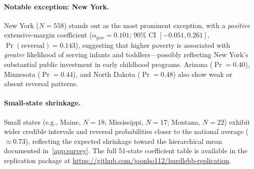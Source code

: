 \paragraph{Notable exception: New York.}
New York ($N = 558$) stands out as the most prominent exception, with a
\emph{positive} extensive-margin coefficient
($\alpha_{\mathrm{pov}} = 0.101$; 90\% CI $[-0.051, 0.261]$,
$\Pr(\text{reversal}) = 0.143$), suggesting that higher poverty is
associated with \emph{greater} likelihood of serving infants and
toddlers---possibly reflecting New York's substantial public investment
in early childhood programs.  Arizona ($\Pr = 0.40$), Minnesota
($\Pr = 0.44$), and North Dakota ($\Pr = 0.48$) also show weak or
absent reversal patterns.

\paragraph{Small-state shrinkage.}
Small states (e.g., Maine, $N = 18$; Mississippi, $N = 17$; Montana,
$N = 22$) exhibit wider credible intervals and reversal probabilities
closer to the national average ($\approx 0.73$), reflecting the
expected shrinkage toward the hierarchical mean documented
in~\cref{app:survey}.  The full 51-state coefficient table is available
in the replication package at
\url{https://github.com/joonho112/hurdlebb-replication}.
